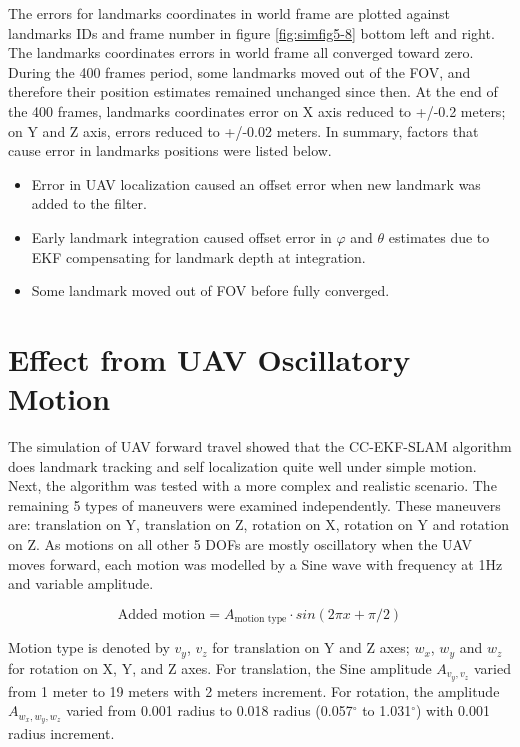 The errors for landmarks coordinates in world frame are plotted
against landmarks IDs and frame number in figure \ref{fig:simfig5-8}
bottom left and right. The landmarks coordinates errors in world frame
all converged toward zero. During the 400 frames period, some
landmarks moved out of the FOV, and therefore their position estimates
remained unchanged since then. At the end of the 400 frames, landmarks
coordinates error on X axis reduced to +/-0.2 meters; on Y and Z axis,
errors reduced to +/-0.02 meters. In summary, factors that cause
error in landmarks positions were listed below. 

\begin{itemize}
  \item Error in UAV localization caused an offset error when new
  landmark was added to the filter.
  \item Early landmark integration caused offset error in $\varphi$
  and $\theta$ estimates due to EKF compensating for landmark depth at
  integration.
  \item Some landmark moved out of FOV before fully converged.
\end{itemize}
\FloatBarrier

\section{Effect from UAV Oscillatory Motion}
The simulation of UAV forward travel showed that the
CC-EKF-SLAM algorithm does landmark tracking and self localization
quite well under simple motion. Next, the algorithm was tested with a
more complex and realistic scenario. The remaining 5 types of
maneuvers were examined independently. These maneuvers are:
translation on Y, translation on Z, rotation on X, rotation on Y and
rotation on Z. As motions on all other 5 DOFs are mostly oscillatory
when the UAV moves forward, each motion was modelled by a Sine wave
with frequency at 1Hz and variable amplitude.

$$\text{Added motion} = A_{\text{motion type}}\cdot sin(2\pi x+\pi/2)$$

Motion type is denoted by $v_y$, $v_z$ for translation on Y and Z
axes; $w_x$, $w_y$ and $w_z$ for rotation on X, Y, and Z axes. For
translation, the Sine amplitude $A_{v_y,v_z}$ varied from 1 meter to
19 meters with 2 meters increment. For rotation, the amplitude
$A_{w_x,w_y,w_z}$ varied from 0.001 radius to 0.018 radius
(0.057$^\circ$ to 1.031$^\circ$) with 0.001 radius increment.

